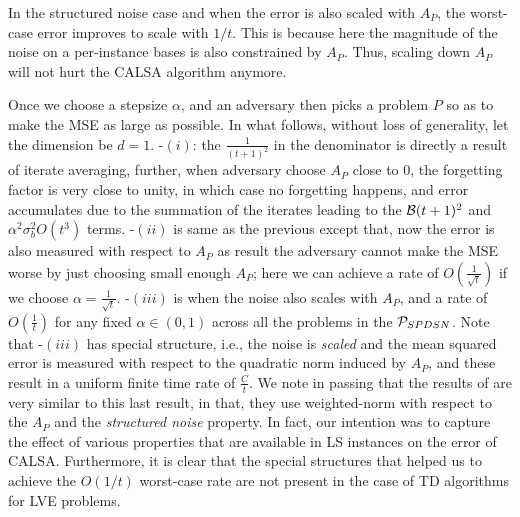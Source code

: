 In the structured noise case and when the error is also scaled with $A_P$, the worst-case error improves to 
scale with $1/t$. This is because here the magnitude of the noise on a per-instance bases is also constrained
by $A_P$. Thus, scaling down $A_P$ will not hurt the CALSA algorithm anymore.

\if
Once we choose a stepsize $\alpha$, and an adversary then picks a problem $P$ so as to make the MSE as large as possible.  In what follows, without loss of generality, let the dimension be $d=1$.
-$(i)$: the $\frac{1}{(t+1)^2}$ in the denominator is directly a result of iterate averaging,  further, when adversary choose $A_P$ close to $0$, the forgetting factor is very close to unity, in which case no forgetting happens, and error accumulates due to the summation of the iterates leading to the $\B(t+1)^2$ and $\alpha^2 \sigma_b^2 O(t^3)$ terms. -$(ii)$ is same as the previous except that, now the error is also measured with respect to $A_P$ as result the adversary cannot make the MSE worse by just choosing small enough $A_P$; here we can achieve a rate of $O(\frac{1}{\sqrt{t}})$ if we choose $\alpha=\frac{1}{\sqrt{t}}$. -$(iii)$ is when the noise also scales with $A_P$, and a rate of $O(\frac{1}{t})$ for any fixed $\alpha\in(0,1)$ across all the problems in the $\P_{SPDSN}$. Note that -$(iii)$ has special structure, i.e., the noise is \emph{scaled} and the mean squared error is measured with respect to the quadratic norm induced by $A_P$, and these result in a uniform finite time rate of $\frac{C}{t}$. 
\fi
We note in passing that the results of \citet{bach-moulines} are very similar to this last result, in that, they use weighted-norm with respect to the $A_P$ and the \emph{structured noise} property. 
In fact, our intention was to capture the effect of various properties that are available in LS instances on the error
of CALSA.
Furthermore, it is clear that the special structures that helped us to achieve the $O(1/t)$ worst-case rate
are not present in the case of TD algorithms for LVE problems.

